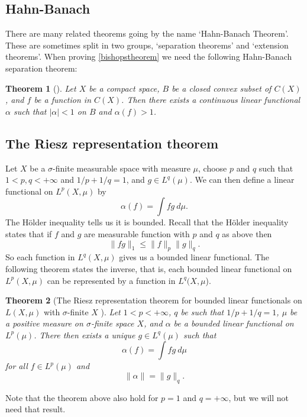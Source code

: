 \documentclass[a4paper,12pt,twoside,BCOR=10mm]{scrbook}
\newtheorem{theorem}{Theorem}[section]
\theoremstyle{definition}
\theoremstyle{definition}
\theoremstyle{definition}
\begin{document}
\subsection{Hahn-Banach}
There are many related theorems going by the name `Hahn-Banach Theorem'.
These are sometimes split in two groups, `separation theorems' and `extension theorems'.
When proving \ref{bishopstheorem} we need the following Hahn-Banach separation theorem:
\begin{theorem}[\citep{pryce}]
Let
	$X$ be a compact space,
	$B$ be a closed convex subset of $C(X)$,
	and $f$ be a function in $C(X)$.
Then there exists a continuous linear functional $\alpha$ such that $|\alpha| < 1$ on $B$ and $\alpha(f) > 1$.
\end{theorem}
\subsection{The Riesz representation theorem}
Let
	$X$ be a $\sigma$-finite measurable space with measure $\mu$,
	choose $p$ and $q$ such that $1 < p, q < +\infty$ and $1/p + 1/q = 1$,
	and $g \in L^q(\mu)$.
We can then define a linear functional on $L^p(X, \mu)$ by
\[
	\alpha(f) = \int fg\ d\mu.
\]
\label{index16}
The Hölder inequality tells us it is bounded.
Recall that the Hölder inequality states that if $f$ and $g$ are measurable function with $p$ and $q$ as above then
\[
	\|fg\|_1 \leq \|f\|_p\|g\|_q.
\]
So each function in $L^q(X, \mu)$ gives us a bounded linear functional.
The following theorem states the inverse, that is, each bounded linear functional on $L^p(X, \mu)$ can be represented by a function in $L^q(X, \mu$).
\begin{theorem}[The Riesz representation theorem for bounded linear functionals on $L(X, \mu)$ with $\sigma$-finite $X$ \citep{rudin2}]
Let $1 < p < +\infty$,
	$q$ be such that $1/p + 1/q = 1$,
	$\mu$ be a positive measure on $\sigma$-finite space $X$,
	and $\alpha$ be a bounded linear functional on $L^p(\mu)$.
There then exists a unique $g \in L^q(\mu)$ such that
\[
	\alpha(f) = \int fg\ d\mu
\]
for all $f \in L^p(\mu)$ and
\[
	\|\alpha\| = \|g\|_q.
\]
\end{theorem}
Note that the theorem above also hold for $p = 1$ and $q = +\infty$, but we will not need that result.
\end{document}
